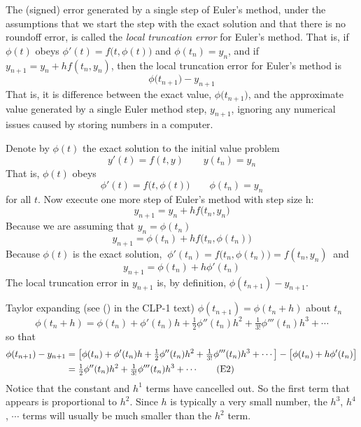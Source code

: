 \begin{defn}\label{def:locTrunc}
The (signed) error generated by a single step of Euler's method, under the assumptions 
that we start the step with the exact solution and that there is no roundoff 
error, is called the \emph{local truncation error} for Euler's method.
That is, if $\phi(t)$ obeys $\phi'(t) = f\big(t,\phi(t)\big)$ and
$\phi(t_n)=y_n$, and if $y_{n+1}=y_n+ hf(t_n,y_n)$,
then the local truncation error for Euler's method is
\begin{equation*}
\phi\big(t_{n+1}\big) -y_{n+1}
\end{equation*}
That is, it is difference between the exact value, $\phi\big(t_{n+1}\big)$,
and the approximate value generated by a single Euler method step, $y_{n+1}$, 
ignoring any numerical issues caused by storing numbers in a computer.
\end{defn}\noindent
Denote by $\phi(t)$ the exact solution to the initial value problem
\begin{equation*}
y'(t)=f(t,y)\qquad y(t_n)=y_n
\end{equation*}
That is, $\phi(t)$ obeys 
\begin{equation*}
\phi'(t) = f\big(t,\phi(t)\big)\qquad
\phi(t_n)=y_n
\end{equation*}
for all $t$. Now execute one more step of Euler's method with step size h:
\begin{equation*}
y_{n+1}=y_n+hf\big(t_n,y_n\big) 
\end{equation*}
Because we are assuming that $y_n=\phi(t_n)$
\begin{equation*}
y_{n+1}= \phi(t_n)+  hf\big(t_n,\phi(t_n)\big)
\end{equation*}
Because $\phi(t)$ is the exact solution, 
$\ \phi'(t_n) = f\big(t_n,\phi(t_n)\big)= f(t_n,y_n)\ $ and 
\begin{equation*}
y_{n+1}= \phi(t_n)+  h\phi'(t_n)
\end{equation*}
The local truncation error in $y_{n+1}$ is, by definition,  $\phi(t_{n+1})-y_{n+1}$. 

Taylor expanding (see () 
in the CLP-1 text) $\phi(t_{n+1})=\phi(t_n+h)$  about $t_n$
\begin{equation*}
\phi(t_n+h)=\phi(t_n)+\phi'(t_n)h+\tfrac{1}{2} \phi''(t_n)h^2
                      +\tfrac{1}{3!}\phi'''(t_n)h^3+\cdots
\end{equation*}
so that
\begin{align*}
\phi(t_{n+1})-y_{n+1} 
&= \big[\phi(t_n)+\phi'(t_n)h+\tfrac{1}{2} \phi''(t_n)h^2
                     +\tfrac{1}{3!}\phi'''(t_n)h^3+\cdots\big]
-\big[\phi(t_n)+  h\phi'(t_n)\big]\notag\\
&= \tfrac{1}{2} \phi''(t_n)h^2+\tfrac{1}{3!}\phi'''(t_n)h^3+\cdots
\tag{E2}\end{align*}
Notice that the constant and $h^1$ terms have cancelled out. So the first term that appears is proportional to $h^2$. Since $h$ is typically a very small number, the $h^3$, $h^4$, $\cdots$ terms will usually be much smaller than 
the $h^2$ term.


